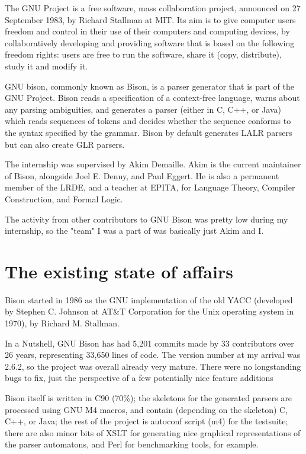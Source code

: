 \documentclass[a4paper,11pt,final]{article}
\begin{document}
  The GNU Project is a free software, mass collaboration project,
  announced on 27 September 1983, by Richard Stallman at MIT\@. Its aim is to
  give computer users freedom and control in their use of their computers and
  computing devices, by collaboratively developing and providing software that
  is based on the following freedom rights: users are free to run the software,
  share it (copy, distribute), study it and modify it.

  GNU bison, commonly known as Bison, is a parser generator that is part of the
  GNU Project. Bison reads a specification of a context-free language, warns
  about any parsing ambiguities, and generates a parser (either in C, C++, or
  Java) which reads sequences of tokens and decides whether the sequence
  conforms to the syntax specified by the grammar. Bison by default generates
  LALR parsers but can also create GLR parsers.

  The internship was supervised by Akim Demaille. Akim is the current
  maintainer of Bison, alongside Joel E. Denny, and Paul Eggert. He is also a
  permanent member of the LRDE, and a teacher at EPITA, for Language Theory,
  Compiler Construction, and Formal Logic.

  The activity from other contributors to GNU Bison was pretty low during my
  internship, so the "team" I was a part of was basically just Akim and I.

  \section*{The existing state of affairs}

  Bison started in 1986 as the GNU implementation of the old YACC (developed by
  Stephen C. Johnson at AT\&T Corporation for the Unix operating system in
  1970), by Richard M. Stallman.

  In a Nutshell, GNU Bison has had 5,201 commits made by 33 contributors over
  26 years, representing 33,650 lines of code. The version number at my arrival
  was 2.6.2, so the project was overall already very mature. There were no
  longstanding bugs to fix, just the perspective of a few potentially nice
  feature additions

  Bison itself is written in C90 (70\%); the skeletons for the generated
  parsers are processed using GNU M4 macros, and contain (depending on the
  skeleton) C, C++, or Java; the rest of the project is autoconf script (m4)
  for the testsuite; there are also minor bits of XSLT for generating nice
  graphical representations of the parser automatons, and Perl for benchmarking
  tools, for example.
\end{document}
